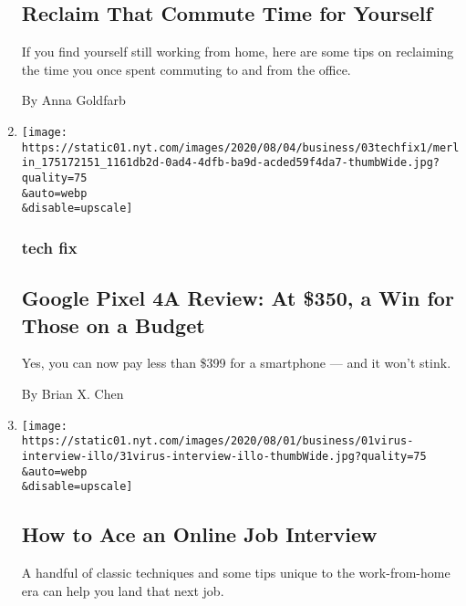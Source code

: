 \begin{enumerate}
  \hypertarget{reclaim-that-commute-time-for-yourself}{%
  \subsection{Reclaim That Commute Time for
  Yourself}\label{reclaim-that-commute-time-for-yourself}}

  If you find yourself still working from home, here are some tips on
  reclaiming the time you once spent commuting to and from the office.

  By Anna Goldfarb
\item
  \href{/2020/08/03/technology/personaltech/google-pixel-4a-review.html}{}

  \texttt{[image: https://static01.nyt.com/images/2020/08/04/business/03techfix1/merlin\_175172151\_1161db2d-0ad4-4dfb-ba9d-acded59f4da7-thumbWide.jpg?quality=75\\\&auto=webp\\\&disable=upscale]}

  \hypertarget{tech-fix}{%
  \subsubsection{tech fix}\label{tech-fix}}

  \hypertarget{google-pixel-4a-review-at-350-a-win-for-those-on-a-budget}{%
  \subsection{Google Pixel 4A Review: At \$350, a Win for Those on a
  Budget}\label{google-pixel-4a-review-at-350-a-win-for-those-on-a-budget}}

  Yes, you can now pay less than \$399 for a smartphone --- and it won't
  stink.

  By Brian X. Chen
\item
  \href{/2020/08/03/business/online-job-interview-tips.html}{}

  \texttt{[image: https://static01.nyt.com/images/2020/08/01/business/01virus-interview-illo/31virus-interview-illo-thumbWide.jpg?quality=75\\\&auto=webp\\\&disable=upscale]}

  \hypertarget{how-to-ace-an-online-job-interview}{%
  \subsection{How to Ace an Online Job
  Interview}\label{how-to-ace-an-online-job-interview}}

  A handful of classic techniques and some tips unique to the
  work-from-home era can help you land that next job.


\end{enumerate}
